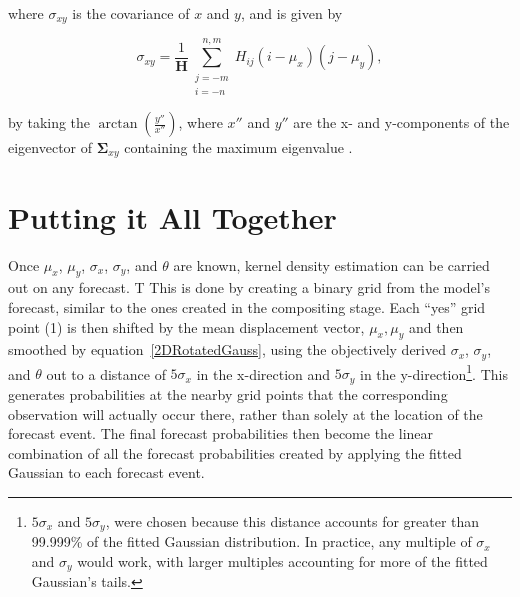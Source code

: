 \noindent where $\sigma_{xy}$ is the covariance of $x$ and $y$, and is given by

    \begin{equation}
        \label{sigmaxy}
        \sigma_{xy} = \frac{1}{\mathbf{H}} \sum\limits_{\substack{j=-m \\ i=-n}}^{n,m}H_{ij}(i - \mu_x)(j - \mu_y),
    \end{equation}

\noindent by taking the $\arctan{\left(\frac{y''}{x''}\right)}$, where $x''$ and $y''$ are the x- and y-components of the eigenvector of $\boldsymbol{\Sigma}_{xy}$ containing the maximum eigenvalue \citep{Lak2010}.




\section{Putting it All Together}
\label{kde}

Once $\mu_x$, $\mu_y$, $\sigma_x$, $\sigma_y$, and $\theta$ are known, kernel density estimation can be carried out on any forecast. T
This is done by creating a binary grid from the model's forecast, similar to the ones created in the compositing stage.
Each ``yes'' grid point (1) is then shifted by the mean displacement vector, ${\mu_x, \mu_y}$ and then smoothed by \mbox{equation \ref{2DRotatedGauss}}, using the objectively derived $\sigma_x$, $\sigma_y$, and $\theta$ out to a distance of $5\sigma_x$ in the x-direction and $5\sigma_y$ in the y-direction\footnote{$5\sigma_x$ and $5\sigma_y$, were chosen because this distance accounts for greater than 99.999\% of the fitted Gaussian distribution.
In practice, any multiple of $\sigma_x$ and $\sigma_y$ would work, with larger multiples accounting for more of the fitted Gaussian's tails.}.
This generates probabilities at the nearby grid points that the corresponding observation will actually occur there, rather than solely at the location of the forecast event.
The final forecast probabilities then become the linear combination of all the forecast probabilities created by applying the fitted Gaussian to each forecast event.







